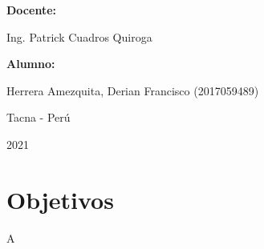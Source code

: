 \documentclass[12pt,letterpaper]{article}
\begin{document}
\begin{titlepage}
\begin{center}
\vspace*{0.3in}
\begin{Large}
\textbf{Docente:} \\
\end{Large}

\vspace*{0.1in}
\begin{large}
Ing. Patrick Cuadros Quiroga\\
\end{large}

\vspace*{0.2in}
\vspace*{0.1in}
\begin{large}
\textbf{Alumno:} \\
\begin{flushleft}
 Herrera Amezquita, Derian Francisco	\hfill	(2017059489) \\


\end{flushleft}
\end{large}
\vspace*{0.1in}
\begin{large}
Tacna - Perú\\
\end{large}
\vspace*{0.1in}
\begin{large}
2021\\
\end{large}

\end{center}

\end{titlepage}



\tableofcontents %
\thispagestyle{empty} %
\newpage
\setcounter{page}{1} %


\section{Objetivos}
A
\end{document}
